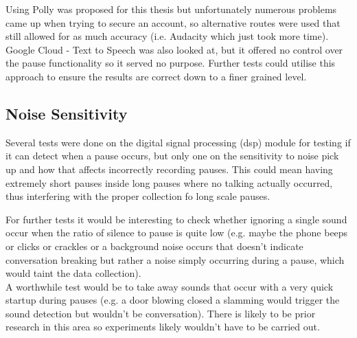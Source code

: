 
Using Polly was proposed for this thesis but unfortunately numerous problems came up when trying to secure an account, so alternative routes were used that still allowed for as much accuracy (i.e. Audacity which just took more time). Google Cloud - Text to Speech was also looked at, but it offered no control over the pause functionality so it served no purpose. Further tests could utilise this approach to ensure the results are correct down to a finer grained level.

%


%


\subsection{Noise Sensitivity}
Several tests were done on the digital signal processing (dsp) module for testing if it can detect when a pause occurs, but only one on the sensitivity to noise pick up and how that affects incorrectly recording pauses. This could mean having extremely short pauses inside long pauses where no talking actually occurred, thus interfering with the proper collection fo long scale pauses. 

For further tests it would be interesting to check whether ignoring a single sound occur when the ratio of silence to pause is quite low (e.g. maybe the phone beeps or clicks or crackles or a background noise occurs that doesn't indicate conversation breaking but rather a noise simply occurring during a pause, which would taint the data collection).\\

A worthwhile test would be to take away sounds that occur with a very quick startup during pauses (e.g. a door blowing closed a slamming would trigger the sound detection but wouldn't be conversation). There is likely to be prior research in this area so experiments likely wouldn't have to be carried out.

